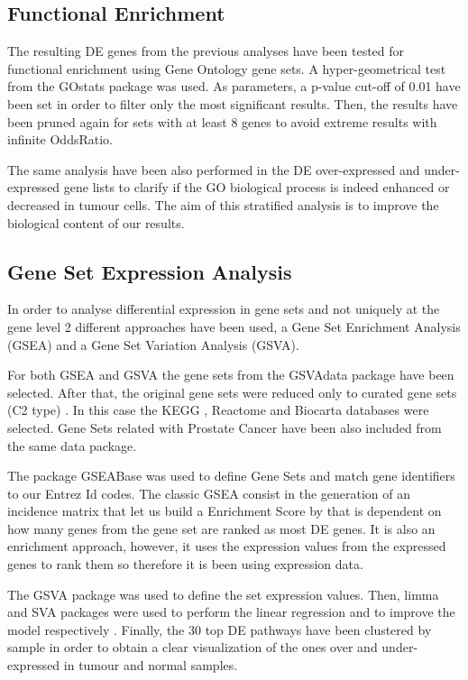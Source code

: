 \documentclass[9pt,twocolumn,twoside]{gsajnl}
\begin{document}
\subsection*{Functional Enrichment}

The resulting DE genes from the previous analyses have been tested for functional enrichment using Gene Ontology gene sets. A hyper-geometrical test from the GOstats package \cite{GOstats} was used. As parameters, a p-value cut-off of 0.01 have been set in order to filter only the most significant results. Then, the results have been pruned again for sets with at least 8 genes to avoid extreme results with infinite OddsRatio.

The same analysis have been also performed in the DE over-expressed and under-expressed gene lists to clarify if the GO biological process is indeed enhanced or decreased in tumour cells. The aim of this stratified analysis is to improve the biological content of our results.


\subsection*{Gene Set Expression Analysis}
In order to analyse differential expression in gene sets and not uniquely at the gene level 2 different approaches have been used, a Gene Set Enrichment Analysis (GSEA) and a Gene Set Variation Analysis (GSVA).


For both GSEA and GSVA the gene sets from the GSVAdata package \cite{GSVAdata} have been selected. After that, the original gene sets were reduced only to curated gene sets  (C2 type) . In this case the KEGG  \cite{kanehisa2016kegg}, Reactome \cite{fabregat2016reactome} and   Biocarta \cite{nishimura2001biocarta} databases were selected. Gene Sets related with Prostate Cancer have been also included from the same data package.


The package GSEABase \cite{GSEABase} was used to define Gene Sets and match gene identifiers to our Entrez Id codes. The classic GSEA consist in the generation of an incidence matrix that let us build a Enrichment Score by that is dependent on how many genes from the gene set are ranked as most DE genes. It is also an enrichment approach, however, it uses the expression values from the expressed genes to rank them so therefore it is been using expression data.

The GSVA package \cite{GSVA} was used to define the set expression values. Then, limma  \cite{limma} and SVA packages were used to perform the linear regression and to improve the model respectively \cite{leek2007capturing,svamanual} . Finally, the 30 top DE pathways have been clustered by sample in order to obtain a clear visualization of the ones over and under-expressed in tumour and normal samples.
\end{document}

